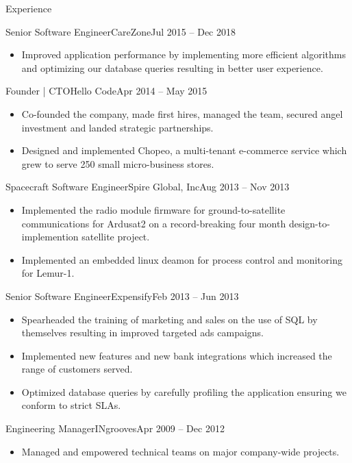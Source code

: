 \documentclass{mcdowellcv}
\begin{document}
\begin{cvsection}{Experience}
\begin{cvsubsection}{Senior Software Engineer}{CareZone}{Jul 2015 -- Dec 2018}
\begin{itemize}
    \item Improved application performance by implementing more efficient algorithms and optimizing our database queries resulting in better user experience.
		\end{itemize}
	\end{cvsubsection}
	\begin{cvsubsection}{Founder | CTO}{Hello Code}{Apr 2014 -- May 2015}
		\begin{itemize}
    \item Co-founded the company, made first hires, managed the team, secured angel investment and landed strategic partnerships.
    \item Designed and implemented Chopeo, a multi-tenant e-commerce service which grew to serve 250 small micro-business stores.
		\end{itemize}
	\end{cvsubsection}
	\begin{cvsubsection}{Spacecraft Software Engineer}{Spire Global, Inc}{Aug 2013 -- Nov 2013}
		\begin{itemize}%
    \item Implemented the radio module firmware for ground-to-satellite communications for Ardusat2 on a record-breaking four month design-to-implemention satellite project.
    \item Implemented an embedded linux deamon for process control and monitoring for Lemur-1.
		\end{itemize}
	\end{cvsubsection}
	\begin{cvsubsection}{Senior Software Engineer}{Expensify}{Feb 2013 -- Jun 2013}
		\begin{itemize}%
    \item Spearheaded the training of marketing and sales on the use of SQL by themselves resulting in improved targeted ads campaigns.
    \item Implemented new features and new bank integrations which increased the range of customers served.
    \item Optimized database queries by carefully profiling the application ensuring we conform to strict SLAs.
		\end{itemize}
	\end{cvsubsection}
	\begin{cvsubsection}{Engineering Manager}{INgrooves}{Apr 2009 -- Dec 2012}
		\begin{itemize}%
    \item Managed and empowered technical teams on major company-wide projects.

\end{itemize}
\end{cvsubsection}
\end{cvsection}
\end{document}
